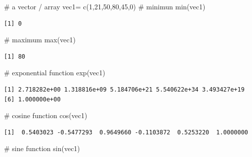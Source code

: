 \documentclass[
  letterpaper,
  DIV=11,
  numbers=noendperiod]{scrreprt}
\newenvironment{Shaded}{\begin{snugshade}}{\end{snugshade}}
\newcommand{\CommentTok}[1]{\textcolor[rgb]{0.37,0.37,0.37}{#1}}
\newcommand{\DecValTok}[1]{\textcolor[rgb]{0.68,0.00,0.00}{#1}}
\newcommand{\FunctionTok}[1]{\textcolor[rgb]{0.28,0.35,0.67}{#1}}
\newcommand{\NormalTok}[1]{\textcolor[rgb]{0.00,0.23,0.31}{#1}}
\newcommand{\OtherTok}[1]{\textcolor[rgb]{0.00,0.23,0.31}{#1}}
\begin{document}
\begin{Shaded}
\begin{Highlighting}[]
\CommentTok{\# a vector / array}
\NormalTok{vec1}\OtherTok{=} \FunctionTok{c}\NormalTok{(}\DecValTok{1}\NormalTok{,}\DecValTok{21}\NormalTok{,}\DecValTok{50}\NormalTok{,}\DecValTok{80}\NormalTok{,}\DecValTok{45}\NormalTok{,}\DecValTok{0}\NormalTok{)}
\CommentTok{\# minimun}
\FunctionTok{min}\NormalTok{(vec1)}
\end{Highlighting}
\end{Shaded}

\begin{verbatim}
[1] 0
\end{verbatim}

\begin{Shaded}
\begin{Highlighting}[]
\CommentTok{\# maximum}
\FunctionTok{max}\NormalTok{(vec1)}
\end{Highlighting}
\end{Shaded}

\begin{verbatim}
[1] 80
\end{verbatim}

\begin{Shaded}
\begin{Highlighting}[]
\CommentTok{\# exponential function}
\FunctionTok{exp}\NormalTok{(vec1)}
\end{Highlighting}
\end{Shaded}

\begin{verbatim}
[1] 2.718282e+00 1.318816e+09 5.184706e+21 5.540622e+34 3.493427e+19
[6] 1.000000e+00
\end{verbatim}

\begin{Shaded}
\begin{Highlighting}[]
\CommentTok{\# cosine function}
\FunctionTok{cos}\NormalTok{(vec1)}
\end{Highlighting}
\end{Shaded}

\begin{verbatim}
[1]  0.5403023 -0.5477293  0.9649660 -0.1103872  0.5253220  1.0000000
\end{verbatim}

\begin{Shaded}
\begin{Highlighting}[]
\CommentTok{\# sine function}
\FunctionTok{sin}\NormalTok{(vec1)}
\end{Highlighting}
\end{Shaded}
\end{document}
